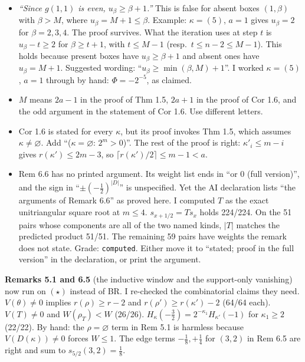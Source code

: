 \documentclass[11pt]{article}
\begin{document}
\begin{itemize}[leftmargin=*]
\item[\textbf{N1}] \emph{``Since $g(1,1)$ is even, $u_\beta\ge\beta+1$.''} This is false for
absent boxes $(1,\beta)$ with $\beta>M$, where $u_\beta=M+1\le\beta$. Example: $\kappa=(5)$,
$a=1$ gives $u_\beta=2$ for $\beta=2,3,4$. The proof survives. What the iteration uses at step
$t$ is $u_\beta-t\ge2$ for $\beta\ge t+1$, with $t\le M-1$ (resp.\ $t\le n-2\le M-1$). This holds
because present boxes have $u_\beta\ge\beta+1$ and absent ones have $u_\beta=M+1$. Suggested
wording: ``$u_\beta\ge\min(\beta,M)+1$''. I worked $\kappa=(5)$, $a=1$ through by hand:
$\Phi=-2^{-5}$, as claimed.
\item[\textbf{N2}] $M$ means $2a-1$ in the proof of Thm 1.5, $2a+1$ in the proof of Cor 1.6, and
the odd argument in the statement of Cor 1.6. Use different letters.
\item[\textbf{N3}] Cor 1.6 is stated for every $\kappa$, but its proof invokes Thm 1.5, which
assumes $\kappa\ne\varnothing$. Add ``($\kappa=\varnothing$: $2^m>0$)''. The rest of the proof is
right: $\kappa'_i\le m-i$ gives $r(\kappa')\le 2m-3$, so $\lceil r(\kappa')/2\rceil\le m-1<a$.
\item[\textbf{N4}] Rem 6.6 has no printed argument. Its weight list ends in ``or 0 (full
version)'', and the sign in ``$\pm(-\tfrac12)^{|D|}$'' is unspecified. Yet the AI declaration
lists ``the arguments of Remark 6.6'' as proved here. I computed $T$ as the exact unitriangular
square root at $m\le4$. $s_{x+1/2}=Ts_x$ holds 224/224. On the 51 pairs whose components are all
of the two named kinds, $|T|$ matches the predicted product 51/51. The remaining 59 pairs have
weights the remark does not state. Grade: \texttt{computed}. Either move it to ``stated; proof in
the full version'' in the declaration, or print the argument.
\end{itemize}

\textbf{Remarks 5.1 and 6.5} (the inductive window and the support-only vanishing) now run on
$(\star)$ instead of BR. I re-checked the combinatorial claims they need. $V(\theta)\ne0$ implies
$r(\rho)\ge r-2$ and $r(\rho')\ge r(\kappa')-2$ (64/64 each). $V(T)\ne0$ and $W(\rho_T)<W$
(26/26). $H_\kappa(-\tfrac32)=2^{-\kappa_1}H_{\kappa'}(-1)$ for $\kappa_1\ge2$ (22/22). By hand:
the $\rho=\varnothing$ term in Rem 5.1 is harmless because $V(D(\kappa))\ne0$ forces $W\le1$. The
edge terms $-\tfrac18,+\tfrac14$ for $(3,2)$ in Rem 6.5 are right and sum to
$s_{5/2}(3,2)=\tfrac18$.
\end{document}
